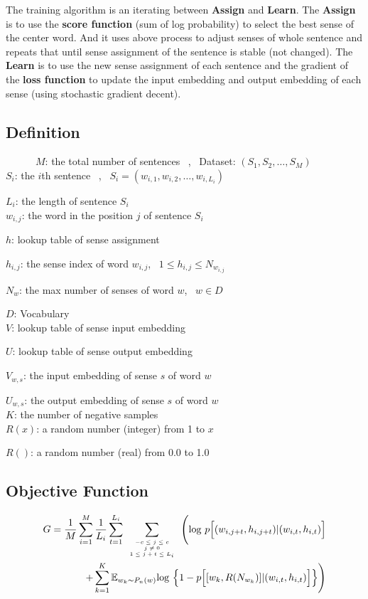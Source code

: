 \documentclass[12pt,a4paper,twoside]{book}
\begin{document}
The training algorithm is an iterating between \textbf{Assign} and \textbf{Learn}. The \textbf{Assign} is to use the \textbf{score function} (sum of log probability) to select the best sense of the center word. And it uses above process to adjust senses of whole sentence and repeats that until sense assignment of the sentence is stable (not changed). The \textbf{Learn} is to use the new sense assignment of each sentence and the gradient of the \textbf{loss function} to update the input embedding and output embedding of each sense (using stochastic gradient decent). 
\subsection{Definition}

\ \ \ \ \ \ $M$: the total number of sentences \ , \ Dataset: $(S_1,S_2,\ldots,S_M)$\\

$S_i$: the $i$th sentence \ , \ $S_i = (w_{i,1},w_{i,2},\ldots,w_{i,L_i})$

$L_i$: the length of sentence $S_i$\\

$w_{i,j}$: the word in the position $j$ of sentence $S_i$

$h$: lookup table of sense assignment

$h_{i,j}$: the sense index of word $w_{i,j}$, \ $1\leq h_{i,j}\leq N_{w_{i,j}}$

$N_w$: the max number of senses of word $w$, \ $w\in D$

$D$: Vocabulary \\

$V$: lookup table of sense input embedding 

$U$: lookup table of  sense output embedding 

$V_{w,s}$: the input embedding of sense $s$ of word $w$

$U_{w,s}$: the output embedding of sense $s$ of word $w$\\

$K$: the number of negative samples\\

$R(x)$: a random number (integer) from 1 to $x$

$R()$: a random number (real) from 0.0 to 1.0
\subsection{Objective Function}
\begin{equation}
\begin{split}
G = \frac{1}{M}\sum_{i=1}^M\frac{1}{L_i}\sum_{t=1}^{L_i}\sum\limits_{\mbox{\tiny$\begin{array}{c}-c\leq j \leq c\\ j\neq 0\\ 1\leq j+t\leq L_i\end{array}$}}\Bigg (\mathrm{log}\ p\Big [(w_{i,j+t},h_{i,j+t})|(w_{i,t},h_{i,t})\Big ] \\
+\sum\limits_{k=1}^K\mathbb{E}_{w_k\sim P_n(w)}\mathrm{log}\ \Big \{1-p\Big[[w_k,R(N_{w_k})]|(w_{i,t},h_{i,t})\Big ] \Big \} \Bigg )
\end{split}
\end{equation} 
\end{document}
